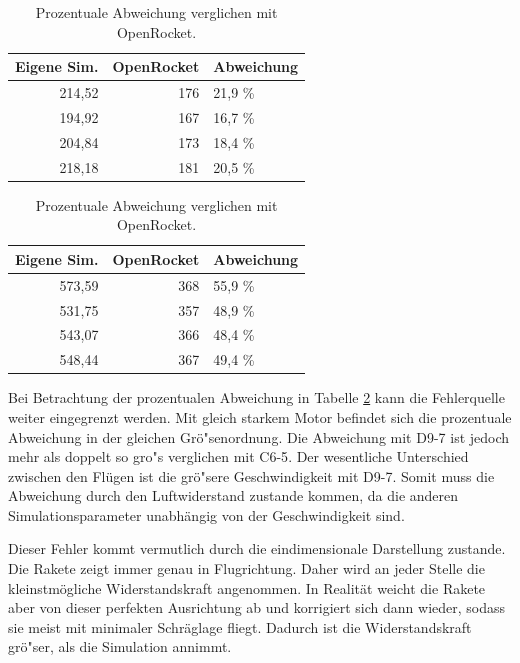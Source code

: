 \documentclass[10pt,a4paper]{article}
\begin{document}
\begin{table}[h]
\caption{Prozentuale Abweichung verglichen mit OpenRocket.}
\label{tab-Simulationsvergleich}
\begin{subtable}[c]{0.49\textwidth}
\begin{tabular}{rr|l}
	\toprule
	Eigene Sim.	& OpenRocket	& Abweichung \\
	\midrule
	214,52		& 176           &  21,9 \% \\
	194,92		& 167           &  16,7 \% \\
	204,84		& 173           &  18,4 \% \\
	218,18		& 181           &  20,5 \% \\
	\bottomrule
\end{tabular}
\end{subtable}
\begin{subtable}[c]{0.49\textwidth}
\begin{tabular}{rr|l}
	\toprule
	Eigene Sim.	& OpenRocket	& Abweichung \\
	\midrule
	573,59		& 368           &  55,9 \% \\
	531,75		& 357           &  48,9 \% \\
	543,07		& 366           &  48,4 \% \\
	548,44		& 367           &  49,4 \% \\
	\bottomrule
\end{tabular}
\end{subtable}
\end{table}

\noindent
Bei Betrachtung der prozentualen Abweichung in Tabelle \ref{tab-Simulationsvergleich} kann die Fehlerquelle weiter eingegrenzt werden. Mit gleich starkem Motor befindet sich die prozentuale Abweichung in der gleichen Grö"senordnung. Die Abweichung mit \textsf{D9-7} ist jedoch mehr als doppelt so gro"s verglichen mit \textsf{C6-5}. Der wesentliche Unterschied zwischen den Flügen ist die grö"sere Geschwindigkeit mit \textsf{D9-7}. Somit muss die Abweichung durch den Luftwiderstand zustande kommen, da die anderen Simulationsparameter unabhängig von der Geschwindigkeit sind.

Dieser Fehler kommt vermutlich durch die eindimensionale Darstellung zustande. Die Rakete zeigt immer genau in Flugrichtung. Daher wird an jeder Stelle die kleinstmögliche Widerstandskraft angenommen. In Realität weicht die Rakete aber von dieser perfekten Ausrichtung ab und korrigiert sich dann wieder, sodass sie meist mit minimaler Schräglage fliegt. Dadurch ist die Widerstandskraft grö"ser, als die Simulation annimmt.
\end{document}
